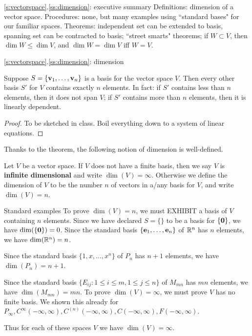 \begin{frame}{\ref{s:vectorspace}.\ref{ss:dimension}: executive summary}
\alert{Definitions:} dimension of a vector space.
\bspace
\alert{Procedures:} none, but many examples using ``standard bases" for our familiar spaces. 
\bspace
\alert{Theorems:} independent set can be extended to basis, spanning set can be contracted to basis; ``street smarts" theorems; if $W\subset V$, then $\dim W\leq \dim V$, and $\dim W=\dim V$ iff $W=V$. 
\end{frame}
\begin{frame}{\ref{s:vectorspace}.\ref{ss:dimension}: dimension}
\footnotesize
\begin{theorem}\label{th:basiscard}
Suppose $S=\{{\mathbf v}_1,\dots ,{\mathbf v}_n\}$ is a basis for the vector space $V$. Then
every other basis $S'$ for $V$ contains exactly $n$ elements.
\bspace
In fact: 
\bb[(a)]
\ii if $S'$ contains {\color{red} less} than $n$ elements, then it does not span $V$; 
\ii if $S'$ contains {\color{blue} more} than $n$ elements, then it is linearly dependent. 
\ee
\end{theorem}
\pause\begin{proof}
To be sketched in class. Boil everything down to a system of linear equations. 
\end{proof}
\pause
Thanks to the theorem, the following notion of \alert{dimension} is well-defined. 
\begin{definition}
Let $V$ be a vector space. 
\bspace
If $V$ does not have a finite basis, then we say $V$ is {\bf infinite dimensional} and write $\dim(V)=\infty$. 
\bspace
Otherwise we define the dimension of $V$ to be the number $n$ of vectors in a/any basis for $V$, and write $\dim(V)=n$. 

\end{definition}
\end{frame}
\begin{frame}{Standard examples}
To prove $\dim(V)=n$, we must \alert{EXHIBIT} a basis of $V$ containing $n$ elements. 
\bb
\pause\ii Since we have declared $S=\{ \}$ to be a basis for $\{{\mathbf 0}\}$, we have $\dim(\{{\mathbf 0}\})=0$.  
\pause\ii Since the standard basis $\{{\mathbf e}_1,\dots,{\mathbf e}_n\}$ of ${\mathbb R}^n$ has $n$ elements, we have $\dim({\mathbb R}^n)=n$. 

\ii Since the standard basis $\{1,x,\dots ,x^n\}$ of $P_n$ has $n+1$ elements, we have $\dim(P_n)=n+1$. 

\ii Since the standard basis $\{E_{ij}\colon 1\leq i\leq m, 1\leq j\leq n\}$ of $M_{mn}$ has $mn$ elements, we have $\dim(M_{mn})=mn$. 
\ee
\pause To prove $\dim(V)=\infty$, we must prove $V$ has no finite basis. 
\bspace
We shown this already for $P_\infty, C^\infty(-\infty,\infty), C^{(n)}(-\infty,\infty), C(-\infty,\infty), F(-\infty,\infty)$.

Thus for each of these spaces $V$ we have $\dim(V)=\infty$.  
\end{frame}
